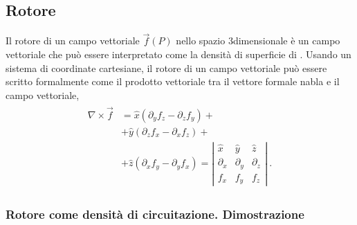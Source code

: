 \documentclass[letterpaper,10pt,italian]{jupyterBook}
\begin{document}
\subsection{Rotore}
\label{\detokenize{ch/vector-calculus/derivatives:rotore}}\label{\detokenize{ch/vector-calculus/derivatives:vector-calculus-derivatives-curl}}
\sphinxAtStartPar
Il rotore di un campo vettoriale \(\vec{f}(P)\) nello spazio 3\sphinxhyphen{}dimensionale è un campo vettoriale che può essere interpretato come la densità di superficie di {\hyperref[\detokenize{ch/vector-calculus/integrals:vector-calculus-integrals-line-circuitation}]{}}. Usando un sistema di coordinate cartesiane, il rotore di un campo vettoriale può essere scritto formalmente come il prodotto vettoriale tra il vettore formale nabla e il campo vettoriale,
\begin{equation*}
\begin{split}\begin{aligned}
  \nabla \times \vec{f} & = \hat{x} \left( \partial_y f_z - \partial_z f_y \right) + \\ 
                        & + \hat{y} \left( \partial_z f_x - \partial_x f_z \right) + \\
                        & + \hat{z} \left( \partial_x f_y - \partial_y f_x \right) 
    = \left| \begin{matrix} \hat{x} & \hat{y} & \hat{z} \\ \partial_x & \partial_y & \partial_z \\ f_x & f_y & f_z \end{matrix} \right| \ .
\end{aligned}\end{split}
\end{equation*}\subsubsection*{Rotore come densità di circuitazione. Dimostrazione}
\end{document}
